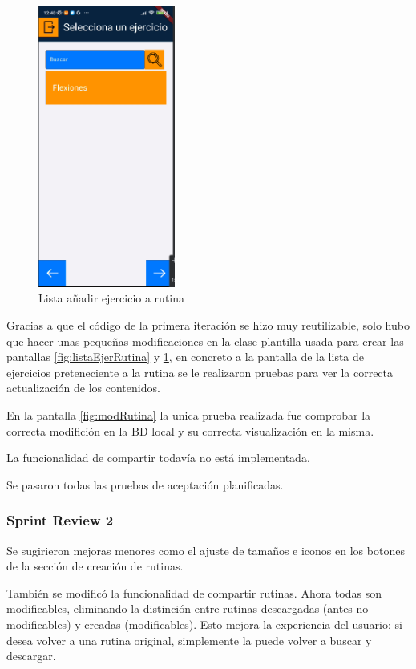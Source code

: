 \begin{figure}[H]
   \centering
    \includegraphics[width=0.4\textwidth]{pantallas/listaAddEjerRut.png}
    \caption{Lista añadir ejercicio a rutina}
    \label{fig:listaAddEjerRut}
\end{figure}

Gracias a que el código de la primera iteración se hizo muy reutilizable, solo hubo que hacer unas pequeñas modificaciones en la clase plantilla usada para crear las pantallas \cref{fig:listaEjerRutina} y \cref{fig:listaAddEjerRut}, en concreto a la pantalla de la lista de ejercicios preteneciente a la rutina se le realizaron pruebas para ver la correcta actualización de los contenidos.

En la pantalla \cref{fig:modRutina} la unica prueba realizada fue comprobar la correcta modifición en la BD local y su correcta visualización en la misma.

La funcionalidad de compartir todavía no está implementada.

Se pasaron todas las pruebas de aceptación planificadas.

\subsubsection{Sprint Review 2}
Se sugirieron mejoras menores como el ajuste de tamaños e iconos en los botones de la sección de creación de rutinas.

También se modificó la funcionalidad de compartir rutinas. Ahora todas son modificables, eliminando la distinción entre rutinas descargadas (antes no modificables) y creadas (modificables). Esto mejora la experiencia del usuario: si desea volver a una rutina original, simplemente la puede volver a buscar y descargar.

